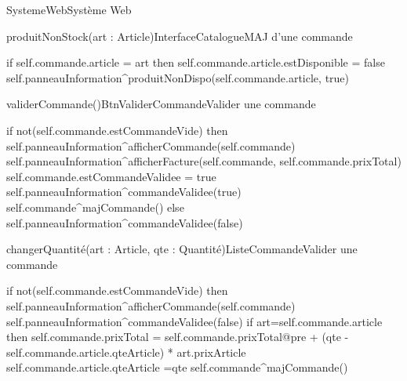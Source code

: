 \begin{OM}{SystemeWeb}{Système Web}
    \begin{OMOperation}{produitNonStock(art : Article)}{InterfaceCatalogue}{MAJ d'une commande}
        \begin{OMMessages}
        \end{OMMessages}
        \OMNoPre
        \begin{OMPost}
            if self.commande.article = art then
            self.commande.article.estDisponible = false
            self.panneauInformation^produitNonDispo(self.commande.article, true)
        \end{OMPost}
    \end{OMOperation}

    \begin{OMOperation}{validerCommande()}{BtnValiderCommande}{Valider une commande}
        \begin{OMMessages}
        \end{OMMessages}
        \OMNoPre
        \begin{OMPost}
            if not(self.commande.estCommandeVide) then
            self.panneauInformation^afficherCommande(self.commande)
            self.panneauInformation^afficherFacture(self.commande,
            self.commande.prixTotal)
            self.commande.estCommandeValidee = true
            self.panneauInformation^commandeValidee(true)
            self.commande^majCommande()
            else
            self.panneauInformation^commandeValidee(false)
        \end{OMPost}
    \end{OMOperation}

    \begin{OMOperation}{changerQuantité(art : Article, qte : Quantité)}{ListeCommande}{Valider une commande}
        \begin{OMMessages}
        \end{OMMessages}
        \OMNoPre
        \begin{OMPost}
            if not(self.commande.estCommandeVide) then
            self.panneauInformation^afficherCommande(self.commande)
            self.panneauInformation^commandeValidee(false)
            if art=self.commande.article then
            self.commande.prixTotal = self.commande.prixTotal@pre + (qte -
            self.commande.article.qteArticle) * art.prixArticle
            self.commande.article.qteArticle =qte
            self.commande^majCommande()
        \end{OMPost}
    \end{OMOperation}


\end{OM}

